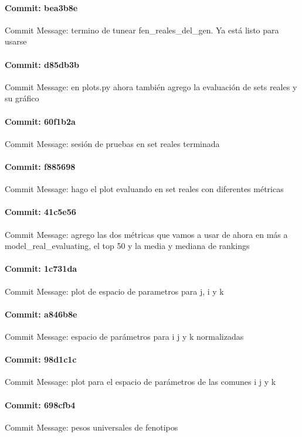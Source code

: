 \documentclass{article}
\begin{document}
\paragraph{Commit: bea3b8e}
Commit Message: termino de tunear fen_reales_del_gen. Ya está listo para usarse

\paragraph{Commit: d85db3b}
Commit Message: en plots.py ahora también agrego la evaluación de sets reales y su gráfico

\paragraph{Commit: 60f1b2a}
Commit Message: sesión de pruebas en set reales terminada

\paragraph{Commit: f885698}
Commit Message: hago el plot evaluando en set reales con diferentes métricas

\paragraph{Commit: 41c5e56}
Commit Message: agrego las dos métricas que vamos a usar de ahora en más a model_real_evaluating, el top 50 y la media y mediana de rankings

\paragraph{Commit: 1c731da}
Commit Message: plot de espacio de parametros para j, i y k

\paragraph{Commit: a846b8e}
Commit Message: espacio de parámetros para i j y k normalizadas

\paragraph{Commit: 98d1c1c}
Commit Message: plot para el espacio de parámetros de las comunes i j y k

\paragraph{Commit: 698cfb4}
Commit Message: pesos universales de fenotipos
\end{document}
